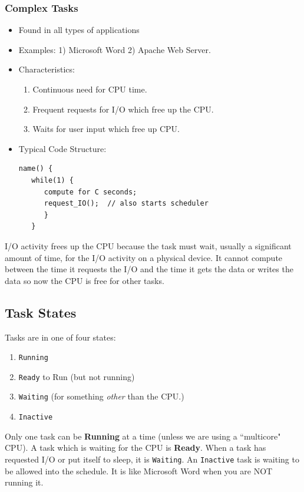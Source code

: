 \documentclass{article}	%
\begin{document}
\subsubsection{Complex Tasks}
\begin{itemize}
        \item Found in all types of applications
        \item Examples: 1) Microsoft Word \hspace{0.15in}     2) Apache Web Server.

        \item Characteristics:
                \begin{enumerate}
                        \item Continuous need for CPU time.
                        \item Frequent requests for I/O which free up the CPU.
                        \item Waits for user input which free up CPU.
                \end{enumerate}
         \item Typical Code Structure:
\begin{verbatim}
name() {
   while(1) {
      compute for C seconds;
      request_IO();  // also starts scheduler
      }
   }
\end{verbatim}
\end{itemize}
I/O activity frees up the CPU because the task must wait, usually a significant amount of
time, for the I/O activity on a physical device.  It cannot compute between the time it requests
the I/O and the time it gets the data or writes the data so now the CPU is free for other tasks.

\subsection{Task States}\label{TaskStates}
Tasks are in one of four states:
\begin{enumerate}
        \item {\tt Running} 
        \item {\tt Ready} to Run (but not running)
        \item {\tt Waiting}    (for something {\it other} than the CPU.)
        \item {\tt Inactive}   
\end{enumerate}
Only one task can be {\bf Running} at a time (unless we are using a ``multicore" CPU).  
A task which is waiting for the CPU 
is {\bf Ready}.  When a task has requested
I/O or put itself to sleep, it is {\tt Waiting}.
An {\tt Inactive} task is waiting to be allowed into the schedule.  It is like 
Microsoft Word when you are NOT running it. 
\end{document}
